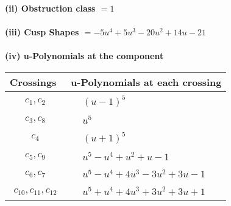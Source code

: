 \documentclass[1p]{elsarticle_modified}
\theoremstyle{definition}
\begin{document}
\flushleft \textbf{(ii) Obstruction class $= 1$}\\~\\
\flushleft \textbf{(iii) Cusp Shapes $= -5 u^4+5 u^3-20 u^2+14 u-21$}\\~\\
\newpage\renewcommand{\arraystretch}{1}
\flushleft \textbf{(iv) u-Polynomials at the component}\newline \\
\begin{tabular}{m{50pt}|m{274pt}}
Crossings & \hspace{64pt}u-Polynomials at each crossing \\
\hline $$\begin{aligned}c_{1},c_{2}\end{aligned}$$&$\begin{aligned}
&(u-1)^5
\end{aligned}$\\
\hline $$\begin{aligned}c_{3},c_{8}\end{aligned}$$&$\begin{aligned}
&u^5
\end{aligned}$\\
\hline $$\begin{aligned}c_{4}\end{aligned}$$&$\begin{aligned}
&(u+1)^5
\end{aligned}$\\
\hline $$\begin{aligned}c_{5},c_{9}\end{aligned}$$&$\begin{aligned}
&u^5- u^4+u^2+u-1
\end{aligned}$\\
\hline $$\begin{aligned}c_{6},c_{7}\end{aligned}$$&$\begin{aligned}
&u^5- u^4+4 u^3-3 u^2+3 u-1
\end{aligned}$\\
\hline $$\begin{aligned}c_{10},c_{11},c_{12}\end{aligned}$$&$\begin{aligned}
&u^5+u^4+4 u^3+3 u^2+3 u+1
\end{aligned}$\\
\hline
\end{tabular}\\~\\
\end{document}
